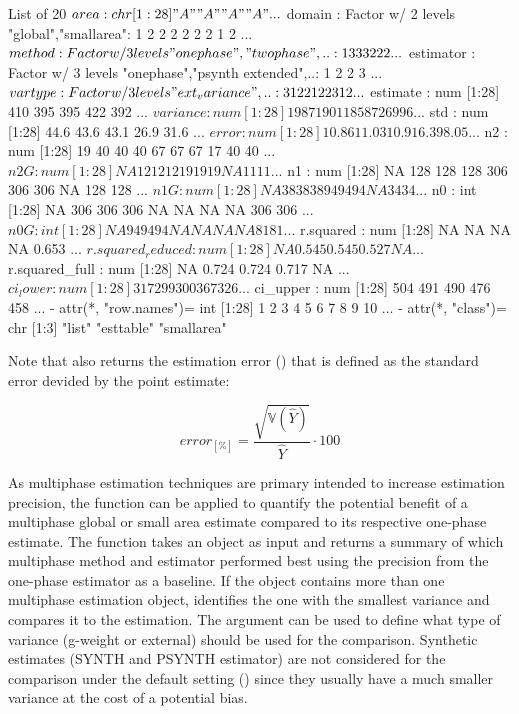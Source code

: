 \documentclass[article]{jss}
\newcommand{\var}{\mathbb{V}}
\begin{document}
\begin{Schunk}
\begin{Sinput}
List of 20
 $ area             : chr [1:28] "A" "A" "A" "A" ...
 $ domain           : Factor w/ 2 levels "global","smallarea": 1 2 2 2 2 2 2 1 2  ...
 $ method           : Factor w/ 3 levels "onephase","twophase",..: 1 3 3 3 2 2 2  ...
 $ estimator        : Factor w/ 3 levels "onephase","psynth extended",..: 1 2 2 3 ...
 $ vartype          : Factor w/ 3 levels "ext_variance",..: 3 1 2 2 1 2 2 3 1 2 ...
 $ estimate         : num [1:28] 410 395 395 422 392 ...
 $ variance         : num [1:28] 1987 1901 1858 726 996 ...
 $ std              : num [1:28] 44.6 43.6 43.1 26.9 31.6 ...
 $ error            : num [1:28] 10.86 11.03 10.91 6.39 8.05 ...
 $ n2               : num [1:28] 19 40 40 40 67 67 67 17 40 40 ...
 $ n2G              : num [1:28] NA 12 12 12 19 19 19 NA 11 11 ...
 $ n1               : num [1:28] NA 128 128 128 306 306 306 NA 128 128 ...
 $ n1G              : num [1:28] NA 38 38 38 94 94 94 NA 34 34 ...
 $ n0               : int [1:28] NA 306 306 306 NA NA NA NA 306 306 ...
 $ n0G              : int [1:28] NA 94 94 94 NA NA NA NA 81 81 ...
 $ r.squared        : num [1:28] NA NA NA NA 0.653 ...
 $ r.squared_reduced: num [1:28] NA 0.545 0.545 0.527 NA ...
 $ r.squared_full   : num [1:28] NA 0.724 0.724 0.717 NA ...
 $ ci_lower         : num [1:28] 317 299 300 367 326 ...
 $ ci_upper         : num [1:28] 504 491 490 476 458 ...
 - attr(*, "row.names")= int [1:28] 1 2 3 4 5 6 7 8 9 10 ...
 - attr(*, "class")= chr [1:3] "list" "esttable" "smallarea"
\end{Sinput}
\end{Schunk}


Note that  also returns the estimation error () that is defined as the standard error devided by the point estimate:

\begin{equation}\label{eq:esterror}
  error_{[\%]}=\frac{\sqrt{\hat{\var}(\hat{Y})}}{\hat{Y}}\cdot100
\end{equation}

As multiphase estimation techniques are primary intended to increase estimation precision, the function  can be applied to quantify the potential benefit of a multiphase global or small area estimate compared to its respective one-phase estimate. The function takes an  object as input and returns a summary of which multiphase method and estimator performed best using the precision from the one-phase estimator as a baseline. If the  object contains more than one multiphase estimation object,  identifies the one with the smallest variance and compares it to the  estimation. The argument  can be used to define what type of variance (g-weight or external) should be used for the comparison. Synthetic estimates (SYNTH and PSYNTH estimator) are not considered for the comparison under the default setting () since they usually have a much smaller variance at the cost of a potential bias.
\end{document}
